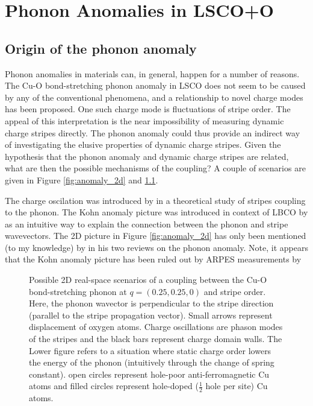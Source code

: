 \chapter{Phonon Anomalies in LSCO+O}

\section{Origin of the phonon anomaly}
Phonon anomalies in materials can, in general, happen for a number of reasons. The Cu-O bond-stretching phonon anomaly in LSCO does not seem to be caused by any of the conventional phenomena, and a relationship to novel charge modes has been proposed. One such charge mode is fluctuations of stripe order. The appeal of this interpretation is the near impossibility of measuring dynamic charge stripes directly. The phonon anomaly could thus provide an indirect way of investigating the elusive properties of dynamic charge stripes. Given the hypothesis that the phonon anomaly and dynamic charge stripes are related, what are then the possible mechanisms of the coupling? A couple of scenarios are given in Figure \ref{fig:anomaly_2d} and \ref{fig:anomaly_1d}.

The charge oscilation was introduced by \citeauthor{Kaneshita2002}\cite{Kaneshita2002} in a theoretical study of stripes coupling to the phonon. The Kohn anomaly picture was introduced in context of LBCO by \citeauthor{Reznik2006}\cite{Reznik2006} as an intuitive way to explain the connection between the phonon and stripe wavevectors. The 2D picture in Figure \ref{fig:anomaly_2d} has only been mentioned (to my knowledge) by \citeauthor{Reznik2010} in his two reviews on the phonon anomaly\cite{Reznik2010, Reznik2012}. Note, it appears that the Kohn anomaly picture has been ruled out by ARPES measurements by \citeauthor{Park2014}\cite{Park2014}

\begin{figure}
    \centering
    
    \caption[2D phonon anomaly sketch]{Possible 2D real-space scenarios of a coupling between the Cu-O bond-stretching phonon at $q=(0.25,0.25,0)$ and stripe order. Here, the phonon wavector is perpendicular to the stripe direction (parallel to the stripe propagation vector). Small arrows represent displacement of oxygen atoms. Charge oscillations are phason modes of the stripes and the black bars represent charge domain walls. The Lower figure refers to a situation where static charge order lowers the energy of the phonon (intuitively through the change of spring constant). open circles represent hole-poor anti-ferromagnetic Cu atoms and filled circles represent hole-doped ($\frac{1}{2}$ hole per site) Cu atoms.}
    \label{fig:anomaly_1d}
\end{figure}

